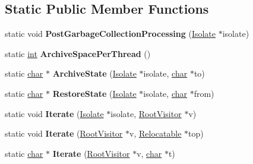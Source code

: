 \subsection*{Static Public Member Functions}
\begin{DoxyCompactItemize}
\item 
\mbox{\label{classv8_1_1internal_1_1Relocatable_aa0b11f4f64d299b9cb1caf9a389789dd}} 
static void {\bfseries Post\+Garbage\+Collection\+Processing} (\mbox{\hyperlink{classv8_1_1internal_1_1Isolate}{Isolate}} $\ast$isolate)
\item 
\mbox{\label{classv8_1_1internal_1_1Relocatable_a95095caf2356678d1258fe8a8b27b44e}} 
static \mbox{\hyperlink{classint}{int}} {\bfseries Archive\+Space\+Per\+Thread} ()
\item 
\mbox{\label{classv8_1_1internal_1_1Relocatable_ae38b3064904fea9515a8bfc7e3505089}} 
static \mbox{\hyperlink{classchar}{char}} $\ast$ {\bfseries Archive\+State} (\mbox{\hyperlink{classv8_1_1internal_1_1Isolate}{Isolate}} $\ast$isolate, \mbox{\hyperlink{classchar}{char}} $\ast$to)
\item 
\mbox{\label{classv8_1_1internal_1_1Relocatable_a02c1913085723950a257972a7f35c93b}} 
static \mbox{\hyperlink{classchar}{char}} $\ast$ {\bfseries Restore\+State} (\mbox{\hyperlink{classv8_1_1internal_1_1Isolate}{Isolate}} $\ast$isolate, \mbox{\hyperlink{classchar}{char}} $\ast$from)
\item 
\mbox{\label{classv8_1_1internal_1_1Relocatable_a6e7789852391b038743216d480da31ab}} 
static void {\bfseries Iterate} (\mbox{\hyperlink{classv8_1_1internal_1_1Isolate}{Isolate}} $\ast$isolate, \mbox{\hyperlink{classv8_1_1internal_1_1RootVisitor}{Root\+Visitor}} $\ast$v)
\item 
\mbox{\label{classv8_1_1internal_1_1Relocatable_ae7a32e959b1126b2dc947e235c2b428d}} 
static void {\bfseries Iterate} (\mbox{\hyperlink{classv8_1_1internal_1_1RootVisitor}{Root\+Visitor}} $\ast$v, \mbox{\hyperlink{classv8_1_1internal_1_1Relocatable}{Relocatable}} $\ast$top)
\item 
\mbox{\label{classv8_1_1internal_1_1Relocatable_a56d0dfb5225e4c794b5541cc5a847722}} 
static \mbox{\hyperlink{classchar}{char}} $\ast$ {\bfseries Iterate} (\mbox{\hyperlink{classv8_1_1internal_1_1RootVisitor}{Root\+Visitor}} $\ast$v, \mbox{\hyperlink{classchar}{char}} $\ast$t)
\end{DoxyCompactItemize}


